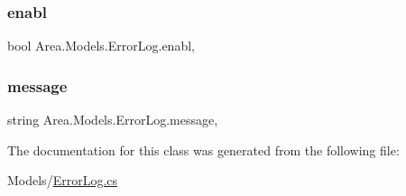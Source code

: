 \subsubsection{\texorpdfstring{enabl}{enabl}}
{\footnotesize\ttfamily bool Area.\+Models.\+Error\+Log.\+enabl\hspace{0.3cm}{\ttfamily [get]}, {\ttfamily [set]}}

\mbox{\label{classArea_1_1Models_1_1ErrorLog_a0a2f2fc766e51324db7b7157c72f73cc}} 
\subsubsection{\texorpdfstring{message}{message}}
{\footnotesize\ttfamily string Area.\+Models.\+Error\+Log.\+message\hspace{0.3cm}{\ttfamily [get]}, {\ttfamily [set]}}



The documentation for this class was generated from the following file\+:\begin{DoxyCompactItemize}
\item 
Models/\mbox{\hyperlink{ErrorLog_8cs}{Error\+Log.\+cs}}\end{DoxyCompactItemize}
